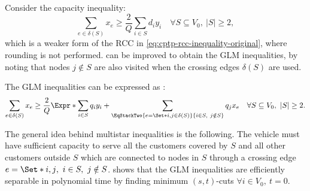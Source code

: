 Consider the capacity inequality:
\begin{equation}
	\label{eq:cptpt-weaker-rcc}
	\sum_{e \in \delta(S)} x_e \ge \frac{2}{Q} \sum_{i \in S} d_i y_i \quad \forall S \subseteq V_0,\ |S| \ge 2,
\end{equation}
which is a weaker form of the RCC in \cref{eq:cptp-rcc-inequality-original}, where rounding is not performed.
 can be improved to obtain the GLM inequalities,
by noting that  nodes $j \notin S$ are also visited when the crossing edges $\delta(S)$ are used.

The GLM inequalities can be expressed as \parencite{jepsen2014}:
\begin{equation}
	\label{eq:cptp-glm-inequality}
	\sum\limits_{e \in \delta(S)} x_e \ge \frac{2}{Q} \Expr*{
		\sum\limits_{i \in S} q_i y_i +
		\sum\limits_{\EqStackTwo{e = \Set*{i, j} \in \delta(S)}{i \in S,\ j \notin S}} q_j x_e
	}
	\quad \forall S \subseteq V_0,\ |S| \ge 2.
\end{equation}

The general idea behind multistar inequalities is the following.
The vehicle must have sufficient capacity to serve
all the customers covered by $S$
and all other customers outside $S$
which are connected to nodes in $S$ through a crossing edge $e = \Set*{i, j},\ i \in S,\ j \notin S$.
\textcite{letchford2006} shows that the GLM inequalities are efficiently separable in
polynomial time by finding minimum $(s, t)$-cuts $\forall i \in V_0,\ t = 0$.
